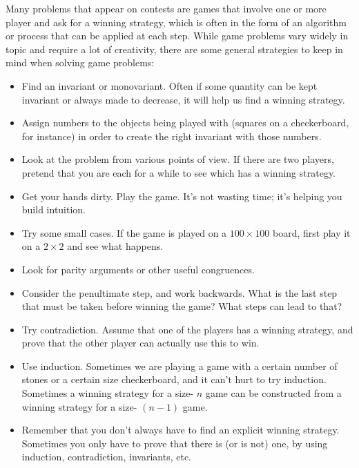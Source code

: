 \documentclass[12pt]{exam}
\begin{document}
Many problems that appear on contests are games that involve one or more player and ask for a winning strategy, which is often in the form of an algorithm or process that can be applied at each step. While game problems vary widely in topic and require a lot of creativity, there are some general strategies to keep in mind when solving game problems:
\begin{itemize}
\item Find an invariant or monovariant. Often if some quantity can be kept invariant or always made to decrease, it will help us find a winning strategy.
\item Assign numbers to the objects being played with (squares on a checkerboard, for instance) in order to create the right invariant with those numbers.
\item Look at the problem from various points of view. If there are two players, pretend that you are each for a while to see which has a winning strategy.
\item Get your hands dirty. Play the game. It's not wasting time; it's helping you build intuition.
\item Try some small cases. If the game is played on a $100 \times 100$ board, first play it on a $2 \times 2$ and see what happens.
\item Look for parity arguments or other useful congruences.
\item Consider the penultimate step, and work backwards. What is the last step that must be taken before winning the game? What steps can lead to that?
\item Try contradiction. Assume that one of the players has a winning strategy, and prove that the other player can actually use this to win.
\item Use induction. Sometimes we are playing a game with a certain number of stones or a certain size checkerboard, and it can't hurt to try induction. Sometimes a winning strategy for a size- $n$ game can be constructed from a winning strategy for a size- $(n-1)$ game.
\item Remember that you don't always have to find an explicit winning strategy. Sometimes you only have to prove that there is (or is not) one, by using induction, contradiction, invariants, etc.
\end{itemize}
\end{document}
